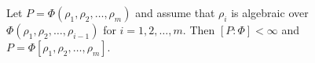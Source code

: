 Let $P = \Phi(\rho_1, \rho_2, \dots, \rho_m)$ and assume that $\rho_i$ is algebraic over $\Phi(\rho_1, \rho_2, \dots, \rho_{i-1})$ for $i = 1, 2, \dots, m$. Then $[P : \Phi] < \infty$ and $P = \Phi[\rho_1, \rho_2, \dots, \rho_m]$.
